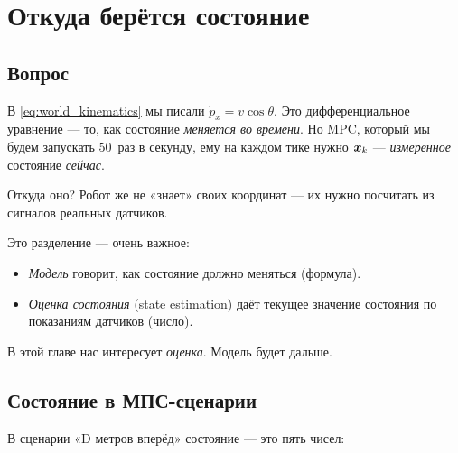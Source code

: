 \chapter{Откуда берётся состояние}
\label{ch:state}

\section{Вопрос}

В \eqref{eq:world_kinematics} мы писали $\dot{p}_x = v\cos\theta$. Это
дифференциальное уравнение --- то, как состояние \emph{меняется во времени}.
Но MPC, который мы будем запускать $50$~раз в секунду, ему на каждом тике
нужно $\bm{x}_k$ --- \emph{измеренное} состояние \emph{сейчас}.

Откуда оно? Робот же не «знает» своих координат --- их нужно посчитать
из сигналов реальных датчиков.

\begin{ideabox}
Это разделение --- очень важное:
\begin{itemize}
  \item \emph{Модель} говорит, как состояние должно меняться (формула).
  \item \emph{Оценка состояния} (state estimation) даёт текущее значение
        состояния по показаниям датчиков (число).
\end{itemize}
В этой главе нас интересует \emph{оценка}. Модель будет дальше.
\end{ideabox}

\section{Состояние в МПС-сценарии}

В сценарии «D метров вперёд» состояние --- это пять чисел:

